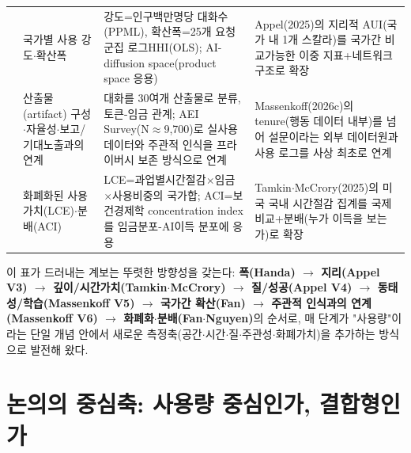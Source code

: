 \documentclass[11pt]{article}
\begin{document}
\begin{longtable}{L{2.8cm}L{2.8cm}L{4.8cm}L{5.0cm}}
\citet{fan-2026-what-countries-use-ai-and} &
국가별 사용 강도$\cdot$확산폭 &
강도=인구백만명당 대화수(PPML), 확산폭=25개 요청군집 로그HHI(OLS); AI-diffusion space(product space 응용) &
Appel(2025)의 지리적 AUI(국가 내 1개 스칼라)를 국가간 비교가능한 이중 지표+네트워크 구조로 확장\\

\citet{massenkoff-2026-cadences} &
산출물(artifact) 구성$\cdot$자율성$\cdot$보고/기대노출과의 연계 &
대화를 30여개 산출물로 분류, 토큰-임금 관계; AEI Survey(N$\approx$9,700)로 실사용 데이터와 주관적 인식을 프라이버시 보존 방식으로 연계 &
Massenkoff(2026c)의 tenure(행동 데이터 내부)를 넘어 설문이라는 외부 데이터원과 사용 로그를 사상 최초로 연계\\

\citet{fan-2026-aggregate-gains-from-ai} &
화폐화된 사용가치(LCE)$\cdot$분배(ACI) &
LCE=과업별시간절감$\times$임금$\times$사용비중의 국가합; ACI=보건경제학 concentration index를 임금분포-AI이득 분포에 응용 &
Tamkin$\cdot$McCrory(2025)의 미국 국내 시간절감 집계를 국제 비교+분배(누가 이득을 보는가)로 확장\\
\end{longtable}

이 표가 드러내는 계보는 뚜렷한 방향성을 갖는다: \textbf{폭(Handa) $\to$ 지리(Appel V3) $\to$ 깊이/시간가치(Tamkin$\cdot$McCrory) $\to$ 질/성공(Appel V4) $\to$ 동태성/학습(Massenkoff V5) $\to$ 국가간 확산(Fan) $\to$ 주관적 인식과의 연계(Massenkoff V6) $\to$ 화폐화$\cdot$분배(Fan$\cdot$Nguyen)}의 순서로, 매 단계가 "사용량"이라는 단일 개념 안에서 새로운 측정축(공간$\cdot$시간$\cdot$질$\cdot$주관성$\cdot$화폐가치)을 추가하는 방식으로 발전해 왔다.

\section{논의의 중심축: 사용량 중심인가, 결합형인가}
\label{sec:axis}
\end{document}
